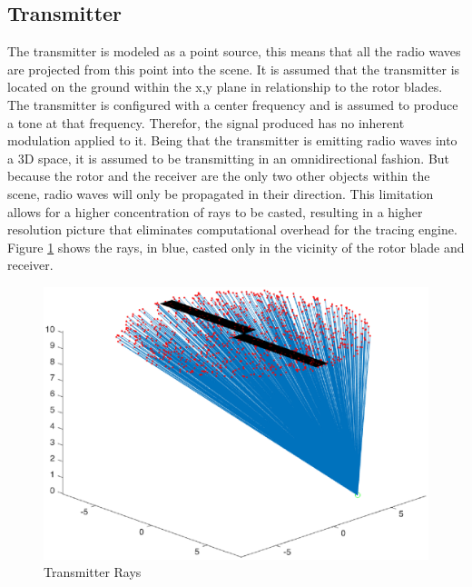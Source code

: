 \subsection{Transmitter}
The transmitter is modeled as a point source, this means that all the radio waves are projected from this point into the scene. It is assumed that the transmitter is located on the ground within the x,y plane in relationship to the rotor blades. The transmitter is configured with a center frequency and is assumed to produce a tone at that frequency. Therefor, the signal produced has no inherent modulation applied to it.
Being that the transmitter is emitting radio waves into a 3D space, it is assumed to be transmitting in an omnidirectional fashion. But because the rotor and the receiver are the only two other objects within the scene, radio waves will only be propagated in their direction. This limitation allows for a higher concentration of rays to be casted, resulting in a higher resolution picture that eliminates computational overhead for the tracing engine. Figure \ref{fig:transmitter_direction} shows the rays, in blue, casted only in the vicinity of the rotor blade and receiver.

\begin{figure}
	\begin{center}
		\includegraphics[width=15cm]{images/radio_propagation/transmitted.eps}
		\caption{Transmitter Rays}
		\label{fig:transmitter_direction}
	\end{center}
\end{figure}

